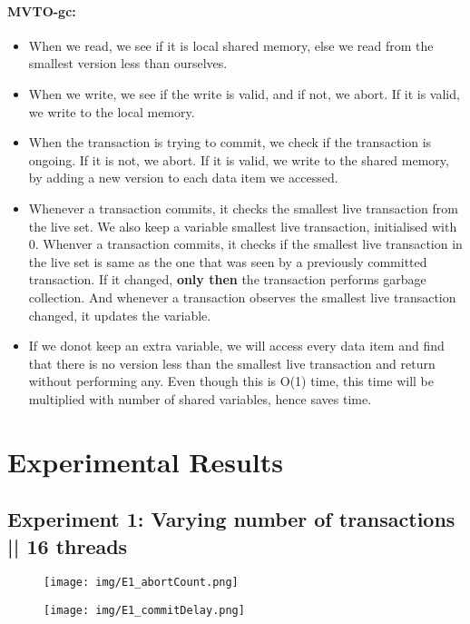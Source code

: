 \documentclass[10pt]{article}
\begin{document}
\paragraph{MVTO-gc:}
\begin{itemize}
    \item When we read, we see if it is local shared memory, else we read from the smallest version less than ourselves.
    \item When we write, we see if the write is valid, and if not, we abort. If it is valid, we write to the local memory.
    \item When the transaction is trying to commit, we check if the transaction is ongoing. If it is not, we abort. If it is valid, we write to the shared memory, by adding a new version to each data item we accessed.
    \item Whenever a transaction commits, it checks the smallest live transaction from the live set. We also keep a variable smallest live transaction, initialised with 0. Whenver a transaction commits, it checks if the smallest live transaction in the live set is same as the one that was seen by a previously committed transaction. If it changed, \textbf{only then} the transaction performs garbage collection. And whenever a transaction observes the smallest live transaction changed, it updates the variable.
    \item If we donot keep an extra variable, we will access every data item and find that there is no version less than the smallest live transaction and return without performing any. Even though this is O(1) time, this time will be multiplied with number of shared variables, hence saves time.
\end{itemize}

\pagebreak
\section{Experimental Results}

\subsection{Experiment 1: Varying number of transactions || 16 threads}
\begin{figure}[h]
    \centering
    \texttt{[image: img/E1\_abortCount.png]}
\end{figure}

\begin{figure}[h]
    \centering
    \texttt{[image: img/E1\_commitDelay.png]}
\end{figure}
\end{document}
